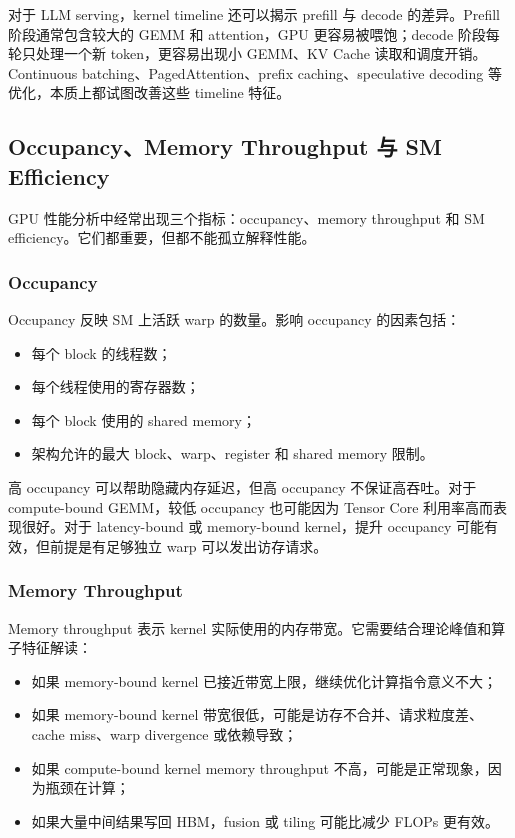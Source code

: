 对于 LLM serving，kernel timeline 还可以揭示 prefill 与 decode 的差异。Prefill 阶段通常包含较大的 GEMM 和 attention，GPU 更容易被喂饱；decode 阶段每轮只处理一个新 token，更容易出现小 GEMM、KV Cache 读取和调度开销。Continuous batching、PagedAttention、prefix caching、speculative decoding 等优化，本质上都试图改善这些 timeline 特征。

\subsection{Occupancy、Memory Throughput 与 SM Efficiency}
\label{subsec:key-metrics}

GPU 性能分析中经常出现三个指标：occupancy、memory throughput 和 SM efficiency。它们都重要，但都不能孤立解释性能。

\subsubsection{Occupancy}

Occupancy 反映 SM 上活跃 warp 的数量。影响 occupancy 的因素包括：

\begin{itemize}
  \item 每个 block 的线程数；
  \item 每个线程使用的寄存器数；
  \item 每个 block 使用的 shared memory；
  \item 架构允许的最大 block、warp、register 和 shared memory 限制。
\end{itemize}

高 occupancy 可以帮助隐藏内存延迟，但高 occupancy 不保证高吞吐。对于 compute-bound GEMM，较低 occupancy 也可能因为 Tensor Core 利用率高而表现很好。对于 latency-bound 或 memory-bound kernel，提升 occupancy 可能有效，但前提是有足够独立 warp 可以发出访存请求。

\subsubsection{Memory Throughput}

Memory throughput 表示 kernel 实际使用的内存带宽。它需要结合理论峰值和算子特征解读：

\begin{itemize}
  \item 如果 memory-bound kernel 已接近带宽上限，继续优化计算指令意义不大；
  \item 如果 memory-bound kernel 带宽很低，可能是访存不合并、请求粒度差、cache miss、warp divergence 或依赖导致；
  \item 如果 compute-bound kernel memory throughput 不高，可能是正常现象，因为瓶颈在计算；
  \item 如果大量中间结果写回 HBM，fusion 或 tiling 可能比减少 FLOPs 更有效。
\end{itemize}


